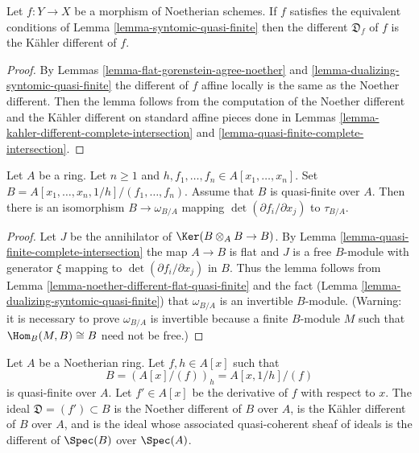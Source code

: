 \begin{lemma}
\label{lemma-different-syntomic-quasi-finite}
Let $f : Y \to X$ be a morphism of Noetherian schemes. If $f$
satisfies the equivalent conditions of Lemma \ref{lemma-syntomic-quasi-finite}
then the different $\mathfrak{D}_f$ of $f$ is the K\"ahler different
of $f$.
\end{lemma}

\begin{proof}
By Lemmas \ref{lemma-flat-gorenstein-agree-noether} and
\ref{lemma-dualizing-syntomic-quasi-finite}
the different of $f$ affine locally is the same as the
Noether different. Then the lemma follows from the
computation of the Noether different and the K\"ahler
different on standard affine pieces done in
Lemmas \ref{lemma-kahler-different-complete-intersection} and
\ref{lemma-quasi-finite-complete-intersection}.
\end{proof}

\begin{lemma}
\label{lemma-different-quasi-finite-complete-intersection}
Let $A$ be a ring. Let $n \geq 1$ and
$h, f_1, \ldots, f_n \in A[x_1, \ldots, x_n]$.
Set $B = A[x_1, \ldots, x_n, 1/h]/(f_1, \ldots, f_n)$.
Assume that $B$ is quasi-finite over $A$.
Then there is an isomorphism $B \to \omega_{B/A}$
mapping $\det(\partial f_i/\partial x_j)$ to $\tau_{B/A}$.
\end{lemma}

\begin{proof}
Let $J$ be the annihilator of $\Ker(B \otimes_A B \to B)$.
By Lemma \ref{lemma-quasi-finite-complete-intersection}
the map $A \to B$ is flat and
$J$ is a free $B$-module with generator $\xi$ mapping to
$\det(\partial f_i/\partial x_j)$ in $B$.
Thus the lemma follows from
Lemma \ref{lemma-noether-different-flat-quasi-finite}
and the fact (Lemma \ref{lemma-dualizing-syntomic-quasi-finite})
that $\omega_{B/A}$ is an invertible $B$-module.
(Warning: it is necessary to prove $\omega_{B/A}$
is invertible because a finite $B$-module $M$ such
that $\Hom_B(M, B) \cong B$ need not be free.)
\end{proof}

\begin{example}
\label{example-different-for-monogenic}
Let $A$ be a Noetherian ring. Let $f, h \in A[x]$ such that
$$
B = (A[x]/(f))_h = A[x, 1/h]/(f)
$$
is quasi-finite over $A$. Let $f' \in A[x]$ be the derivative
of $f$ with respect to $x$. The ideal $\mathfrak{D} = (f') \subset B$
is the Noether different of $B$ over $A$,
is the K\"ahler different of $B$ over $A$, and
is the ideal whose associated quasi-coherent sheaf of ideals is the
different of $\Spec(B)$ over $\Spec(A)$.
\end{example}

